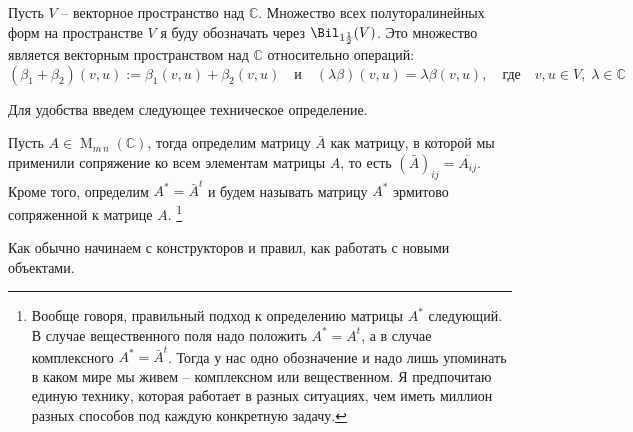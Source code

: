 \begin{definition}
Пусть $V$ -- векторное пространство над $\mathbb C$.
Множество всех полуторалинейных форм на пространстве $V$ я буду обозначать через $\Bil_{1\frac{1}{2}}(V)$.
Это множество является векторным пространством над $\mathbb C$ относительно операций:
\[
(\beta_1+\beta_2)(v, u) := \beta_1(v,u) + \beta_2(v,u)\quad\text{и}\quad (\lambda\beta)(v,u) = \lambda\beta(v,u),\quad\text{где}\quad v,u\in V,\;\lambda\in \mathbb C
\]
\end{definition}

Для удобства введем следующее техническое определение.
\begin{definition}
Пусть $A\in \operatorname{M}_{m\,n}(\mathbb C)$, тогда определим матрицу $\bar A$ как матрицу, в которой мы применили сопряжение ко всем элементам матрицы $A$, то есть $(\bar A)_{ij} = \overline{A_{ij}}$.
Кроме того, определим $A^* = \bar A^t$ и будем называть матрицу $A^*$ эрмитово сопряженной к матрице $A$.%
\footnote{Вообще говоря, правильный подход к определению матрицы $A^*$ следующий.
В случае вещественного поля надо положить $A^* = A^t$, а в случае комплексного $A^* = \bar A^t$.
Тогда у нас одно обозначение и надо лишь упоминать в каком мире мы живем -- комплексном или вещественном.
Я предпочитаю единую технику, которая работает в разных ситуациях, чем иметь миллион разных способов под каждую конкретную задачу.}
\end{definition}

Как обычно начинаем с конструкторов и правил, как работать с новыми объектами.

